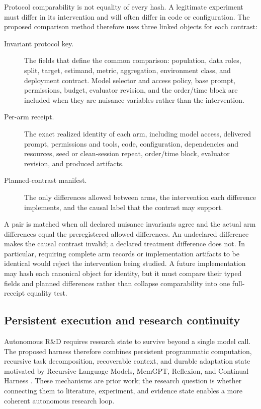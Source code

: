 \documentclass[11pt,a4paper]{article}
\begin{document}
Protocol comparability is not equality of every hash.  A legitimate experiment
must differ in its intervention and will often differ in code or configuration.
The proposed comparison method therefore uses three linked objects for each contrast:

\begin{description}
  \item[Invariant protocol key.] The fields that define the common comparison:
  population, data roles, split, target, estimand, metric, aggregation,
  environment class, and deployment contract.  Model selector and access
  policy, base prompt, permissions, budget, evaluator revision, and the
  order/time block are included when they are nuisance variables rather than the
  intervention.
  \item[Per-arm receipt.] The exact realized identity of each arm, including
  model access, delivered prompt, permissions and tools, code, configuration,
  dependencies and resources, seed or clean-session repeat, order/time block,
  evaluator revision, and produced artifacts.
  \item[Planned-contrast manifest.] The only differences allowed between arms,
  the intervention each difference implements, and the causal label that the
  contrast may support.
\end{description}

A pair is matched when all declared nuisance invariants agree and the actual arm
differences equal the preregistered allowed differences.  An undeclared
difference makes the causal contrast invalid; a declared treatment difference
does not.  In particular, requiring complete arm records or implementation
artifacts to be identical would reject the intervention being studied.  A future implementation
may hash each canonical object for identity, but it must compare their typed
fields and planned differences rather than collapse comparability into one
full-receipt equality test.

\subsection{Persistent execution and research continuity}

Autonomous R\&D requires research state to survive beyond a single model call.
The proposed harness therefore combines persistent programmatic computation, recursive task
decomposition, recoverable context, and durable adaptation state motivated by
Recursive Language Models, MemGPT, Reflexion, and Continual Harness
\citep{rlm2025,memgpt2023,reflexion2023,continual2026}.  These mechanisms are prior work;
the research question is whether connecting them to literature, experiment, and
evidence state enables a more coherent autonomous research loop.
\end{document}
